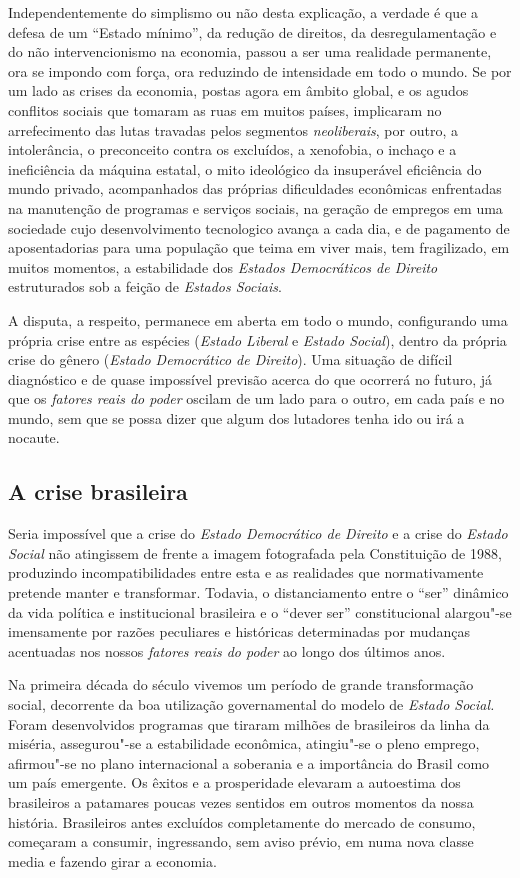 Independentemente do simplismo ou não desta explicação, a verdade é que
a defesa de um ``Estado mínimo'', da redução de direitos, da
desregulamentação e do não intervencionismo na economia, passou a ser
uma realidade permanente, ora se impondo com força, ora reduzindo de
intensidade em todo o mundo. Se por um lado as crises da economia,
postas agora em âmbito global, e os agudos conflitos sociais que tomaram
as ruas em muitos países, implicaram no arrefecimento das lutas travadas
pelos segmentos \emph{neoliberais}, por outro, a intolerância, o
preconceito contra os excluídos, a xenofobia, o inchaço e a ineficiência
da máquina estatal, o mito ideológico da insuperável eficiência do mundo
privado, acompanhados das próprias dificuldades econômicas enfrentadas
na manutenção de programas e serviços sociais, na geração de empregos em
uma sociedade cujo desenvolvimento tecnologico avança a cada dia, e de
pagamento de aposentadorias para uma população que teima em viver mais,
tem fragilizado, em muitos momentos, a estabilidade dos \emph{Estados
Democráticos de Direito} estruturados sob a feição de \emph{Estados
Sociais}.

A disputa, a respeito, permanece em aberta em todo o mundo, configurando
uma própria crise entre as espécies (\emph{Estado Liberal} e
\emph{Estado Social}), dentro da própria crise do gênero (\emph{Estado
Democrático de Direito}). Uma situação de difícil diagnóstico e de quase
impossível previsão acerca do que ocorrerá no futuro, já que os
\emph{fatores reais do poder} oscilam de um lado para o outro\emph{,} em
cada país e no mundo, sem que se possa dizer que algum dos lutadores
tenha ido ou irá a nocaute.

\subsection{A crise brasileira}

Seria impossível que a crise do \emph{Estado Democrático de Direito} e a
crise do \emph{Estado Social} não atingissem de frente a imagem
fotografada pela Constituição de 1988, produzindo incompatibilidades
entre esta e as realidades que normativamente pretende manter e
transformar. Todavia, o distanciamento entre o ``ser'' dinâmico
da vida política e institucional brasileira e o ``dever ser''
constitucional alargou"-se imensamente por razões peculiares e históricas
determinadas por mudanças acentuadas nos nossos \emph{fatores reais do
poder} ao longo dos últimos anos.

Na primeira década do século  vivemos um período de grande
transformação social, decorrente da boa utilização governamental do
modelo de \emph{Estado Social.} Foram desenvolvidos programas que
tiraram milhões de brasileiros da linha da miséria, assegurou"-se a
estabilidade econômica, atingiu"-se o pleno emprego, afirmou"-se no plano
internacional a soberania e a importância do Brasil como um país
emergente. Os êxitos e a prosperidade elevaram a autoestima dos
brasileiros a patamares poucas vezes sentidos em outros momentos da
nossa história. Brasileiros antes excluídos completamente do mercado de
consumo, começaram a consumir, ingressando, sem aviso prévio, em numa
nova classe media e fazendo girar a economia.

